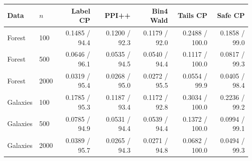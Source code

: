 \begin{tabular}{llrrrrr}
\toprule
Data & $n$ & Label CP & PPI++ & Bin4 Wald & Tails CP & Safe CP \\
\midrule
Forest & 100 & 0.1485 / 94.4 & 0.1200 / 92.3 & 0.1179 / 92.0 & 0.2488 / 100.0 & 0.1858 / 99.0 \\
Forest & 500 & 0.0646 / 96.1 & 0.0535 / 94.5 & 0.0540 / 94.4 & 0.1117 / 100.0 & 0.0817 / 99.3 \\
Forest & 2000 & 0.0319 / 95.4 & 0.0268 / 95.0 & 0.0272 / 95.5 & 0.0554 / 99.9 & 0.0405 / 98.4 \\
Galaxies & 100 & 0.1785 / 95.3 & 0.1187 / 93.4 & 0.1172 / 92.8 & 0.3034 / 100.0 & 0.2236 / 99.2 \\
Galaxies & 500 & 0.0785 / 94.9 & 0.0531 / 94.4 & 0.0539 / 94.4 & 0.1372 / 100.0 & 0.0994 / 99.1 \\
Galaxies & 2000 & 0.0389 / 95.7 & 0.0265 / 94.3 & 0.0271 / 94.8 & 0.0682 / 100.0 & 0.0494 / 99.3 \\
\bottomrule
\end{tabular}